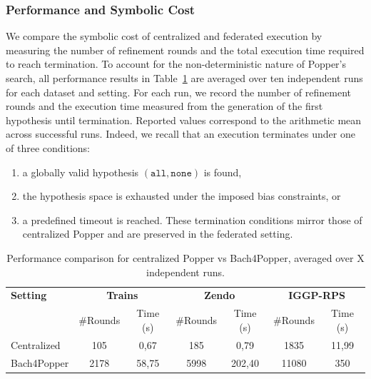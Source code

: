 \subsubsection{Performance and Symbolic Cost}
We compare the symbolic cost of centralized and federated execution by measuring the number of refinement rounds and the total execution time required to reach termination.
To account for the non-deterministic nature of Popper’s search, all performance results in Table~\ref{tab:perf} are averaged over ten independent runs for each dataset and setting.
For each run, we record the number of refinement rounds and the execution time measured from the generation of the first hypothesis until termination.
Reported values correspond to the arithmetic mean across successful runs. Indeed, we recall that an execution terminates under one of three conditions:
\begin{enumerate}
    \item a globally valid hypothesis $(\texttt{all}, \texttt{none})$ is found,
\item the hypothesis space is exhausted under the imposed bias constraints, or
\item a predefined timeout is reached.
These termination conditions mirror those of centralized Popper and are preserved in the federated setting.
\end{enumerate}

\begin{table}[ht]
\centering
\small
\caption{Performance comparison for centralized Popper vs Bach4Popper, averaged over X independent runs.}
\label{tab:perf}
\setlength{\tabcolsep}{6pt}
\begin{tabular}{l|cc|cc|cc}
\toprule
\textbf{Setting}
& \multicolumn{2}{c|}{\textbf{Trains}}
& \multicolumn{2}{c|}{\textbf{Zendo}}
& \multicolumn{2}{c}{\textbf{IGGP-RPS}} \\
& \#Rounds & Time (s)
& \#Rounds & Time (s)
& \#Rounds & Time (s) \\
\midrule

Centralized
& 105 & 0,67
& 185 & 0,79
& 1835 & 11,99\\

\midrule

Bach4Popper
& 2178 &58,75
& 5998 &202,40
& 11080 & 350 \\ 

\bottomrule
\end{tabular}
\end{table}

